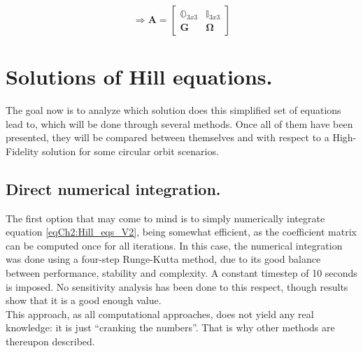 	\begin{equation}
	\Rightarrow \bm A = \left[ \begin{array}{c|c}
	\mathbb{O}_{3x3} 	& \mathbb{I}_{3x3}\\
	\hline
	\bm G 				& \bm \Omega
	\end{array}\right]
	\label{eqCh3:A_G_omega}
	\end{equation}
\section{Solutions of Hill equations.}
%
%
\indent The goal now is to analyze which solution does this simplified set of equations lead to, which will be done through several methods. Once all of them have been presented, they will be compared between themselves and with respect to a High-Fidelity solution for some circular orbit scenarios.
%
	\subsection{Direct numerical integration.}
	\indent The first option that may come to mind is to simply numerically integrate equation \eqref{eqCh2:Hill_eqs_V2}, being somewhat efficient, as the coefficient matrix can be computed once for all iterations. In this case, the numerical integration was done using a four-step Runge-Kutta method, due to its good balance between performance, stability and complexity. A constant timestep of 10 seconds is imposed. No sensitivity analysis has been done to this respect, though results show that it is a good enough value.\\
	\indent This approach, as all computational approaches, does not yield any real knowledge: it is just ``cranking the numbers''. That is why other methods are thereupon described.
